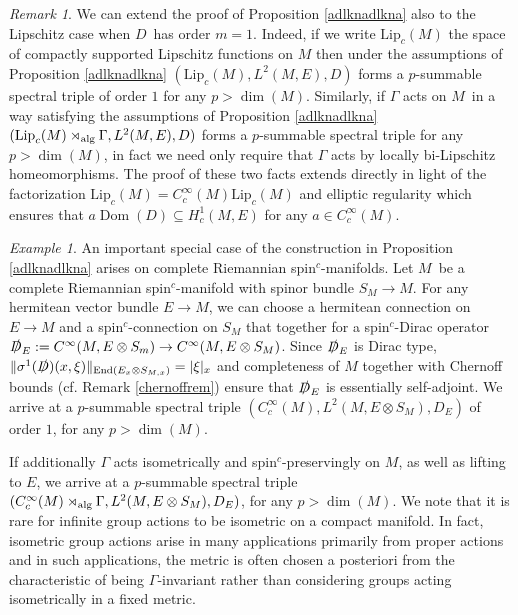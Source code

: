 \documentclass[a4paper,reqno]{amsart}
\numberwithin{equation}{section}
\def\End{\operatorname{End}}
\def\Dom{\operatorname{Dom}}
\def\dim{\operatorname{dim}}
\theoremstyle{definition}
\theoremstyle{remark}
\newtheorem{remark}[thm]{Remark}
\newtheorem{example}[thm]{Example}
\begin{document}
\begin{remark}
\label{extendtolip}
We can extend the proof of Proposition \ref{adlknadlkna} also to the Lipschitz case when $D$ has order $m=1$. Indeed, if we write $\mathrm{Lip}_c(M)$ the space of compactly supported Lipschitz functions on $M$ then under the assumptions of Proposition \ref{adlknadlkna} $(\mathrm{Lip}_c(M),L^2(M,E),D)$ forms a $p$-summable spectral triple of order $1$ for any $p>\dim(M)$. Similarly, if $\Gamma$ acts on $M$ in a way satisfying the assumptions of Proposition \ref{adlknadlkna} $(\mathrm{Lip}_c(M)\rtimes_{\rm alg}\Gamma,L^2(M,E),D)$ forms a $p$-summable spectral triple for any $p>\dim(M)$, in fact we need only require that $\Gamma$ acts by locally bi-Lipschitz homeomorphisms. The proof of these two facts extends directly in light of the factorization $\mathrm{Lip}_c(M)=C^\infty_c(M)\mathrm{Lip}_c(M)$ and elliptic regularity which ensures that $a \Dom(D)\subseteq H^1_c(M,E)$ for any $a\in C^\infty_c(M)$.
\end{remark}




\begin{example}
\label{akandaojnd}
An important special case of the construction in Proposition \ref{adlknadlkna} arises on complete Riemannian spin$^c$-manifolds. Let $M$ be a complete Riemannian spin$^c$-manifold with spinor bundle $S_M\to M$. For any hermitean vector bundle $E\to M$, we can choose a hermitean connection on $E\to M$ and a spin$^c$-connection on $S_M$ that together for a spin$^c$-Dirac operator $\slashed{D}_E:=C^\infty(M,E\otimes S_m)\to C^\infty(M,E\otimes S_M)$. Since $\slashed{D}_E$ is Dirac type, $\|\sigma^1(\slashed{D})(x,\xi)\|_{\End(E_x\otimes S_{M,x})}=|\xi|_x$ and completeness of $M$ together with Chernoff bounds (cf. Remark \ref{chernoffrem}) ensure that $\slashed{D}_E$ is essentially self-adjoint. We arrive at a $p$-summable spectral triple $(C^\infty_c(M),L^2(M,E\otimes S_M),D_E)$ of order $1$, for any $p>\dim(M)$. 


If additionally $\Gamma$ acts isometrically and spin$^c$-preservingly on $M$, as well as lifting to $E$, we arrive at a $p$-summable spectral triple $(C^\infty_c(M)\rtimes_{\rm alg}\Gamma,L^2(M,E\otimes S_M),D_E)$, for any $p>\dim(M)$. We note that it is rare for infinite group actions to be isometric on a compact manifold. In fact, isometric group actions arise in many applications primarily from proper actions and in such applications, the metric is often chosen a posteriori from the characteristic of being $\Gamma$-invariant rather than considering groups acting isometrically in a fixed metric.
\end{example}
\end{document}
